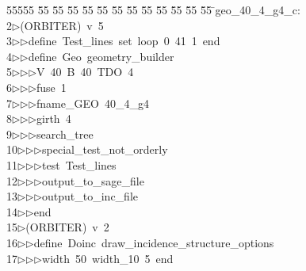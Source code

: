 %
%
\begin{tabbing}
55555 \= 55 \= 55 \= 55 \= 55 \= 55 \= 55 \= 55 \= 55 \= 55 \= 55 \= 55 \= 55 \= \>geo\_40\_4\_g4\_c:\\[0pt]
2\>$\triangleright$\>(ORBITER)\ v\ 5\ \\[0pt]
3\>$\triangleright$\>$\triangleright$\>define\ Test\_lines\ set\ loop\ 0\ 41\ 1\ end\ \\[0pt]
4\>$\triangleright$\>$\triangleright$\>define\ Geo\ geometry\_builder\ \\[0pt]
5\>$\triangleright$\>$\triangleright$\>$\triangleright$\>V\ 40\ B\ 40\ TDO\ 4\ \\[0pt]
6\>$\triangleright$\>$\triangleright$\>$\triangleright$\>fuse\ 1\ \\[0pt]
7\>$\triangleright$\>$\triangleright$\>$\triangleright$\>fname\_GEO\ 40\_4\_g4\ \\[0pt]
8\>$\triangleright$\>$\triangleright$\>$\triangleright$\>girth\ 4\ \\[0pt]
9\>$\triangleright$\>$\triangleright$\>$\triangleright$\>search\_tree\ \\[0pt]
10\>$\triangleright$\>$\triangleright$\>$\triangleright$\>special\_test\_not\_orderly\ \\[0pt]
11\>$\triangleright$\>$\triangleright$\>$\triangleright$\>test\ Test\_lines\ \\[0pt]
12\>$\triangleright$\>$\triangleright$\>$\triangleright$\>output\_to\_sage\_file\ \\[0pt]
13\>$\triangleright$\>$\triangleright$\>$\triangleright$\>output\_to\_inc\_file\ \\[0pt]
14\>$\triangleright$\>$\triangleright$\>end\\[0pt]
15\>$\triangleright$\>(ORBITER)\ v\ 2\ \\[0pt]
16\>$\triangleright$\>$\triangleright$\>define\ Doinc\ draw\_incidence\_structure\_options\ \\[0pt]
17\>$\triangleright$\>$\triangleright$\>$\triangleright$\>width\ 50\ width\_10\ 5\ end\ \\[0pt]

\end{tabbing}
